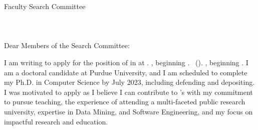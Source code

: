 \documentclass[10pt]{article}
\begin{document}
\thispagestyle{plain}

\pagestyle{empty}

Faculty Search Committee \\
\DepartmentName \\
\InstitutionName \\
\DepartmentAddress\\

Dear Members of the Search Committee:

I am writing to apply for the position of \PositionName{} 
\ifx\DepartmentName\undefined
\else
in 
\DepartmentName{} 
\fi
at \InstitutionName{}%
\ifx\shortInstitutionName\undefined
    \ifx\startDate\undefined
        .
    \else
        , beginning \startDate{}. %
    \fi
\else
    ~(\shortInstitutionName).   \ifx\startDate\undefined
    \else
        , beginning \startDate{}. %
    \fi
\fi
I am a doctoral candidate at Purdue University, and I am scheduled to complete my Ph.D. in Computer Science by July 2023, including defending and depositing.
I was motivated to apply 
as I believe I can contribute to \ifx\shortInstitutionName\undefined \InstitutionName{}'s \else \shortInstitutionName{} with my commitment to pursue teaching, the experience of 
attending a multi-faceted public research university, expertise in Data Mining, and Software Engineering,  and my focus on 
impactful research and education. 
%
%
\end{document}
